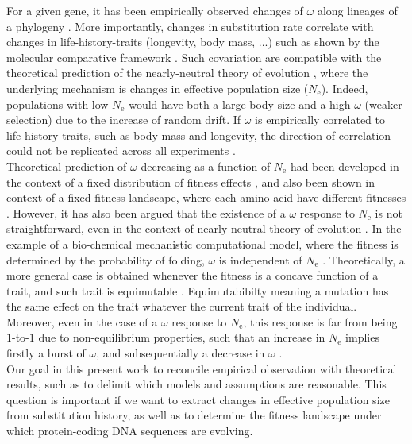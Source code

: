 \documentclass{article}
\newcommand{\Ne}{N_{\mathrm{e}}}
\newcommand{\dnds}{\omega}
\begin{document}
For a given gene, it has been empirically observed changes of $\dnds$ along lineages of a phylogeny \cite{Yang2001, Zhang2004}.
More importantly, changes in substitution rate correlate with changes in life-history-traits (longevity, body mass, ...) such as shown by the molecular comparative framework \cite{Lartillot2011,Weber2014}.
Such covariation are compatible with the theoretical prediction of the nearly-neutral theory of evolution \cite{Ohta1972, Ohta1992}, where the underlying mechanism is changes in effective population size ($\Ne$).
Indeed, populations with low $\Ne$ would have both a large body size and a high $\dnds$ (weaker selection) due to the increase of random drift.
If $\dnds$ is empirically correlated to life-history traits, such as body mass and longevity, the direction of correlation could not be replicated across all experiments \cite{Figuet2016}.\\

Theoretical prediction of $\dnds$ decreasing as a function of $\Ne$ had been developed in the context of a fixed distribution of fitness effects \cite{Ohta1972, Welch2008}, and also been shown in context of a fixed fitness landscape, where each amino-acid have different fitnesses \cite{Spielman2015a, DosReis2015}.
However, it has also been argued that the existence of a $\dnds$ response to $\Ne$ is not straightforward, even in the context of nearly-neutral theory of evolution \cite{Lanfear2014}.
In the example of a bio-chemical mechanistic computational model, where the fitness is determined by the probability of folding, $\dnds$ is independent of $\Ne$ \cite{Goldstein2013}.
Theoretically, a more general case is obtained whenever the fitness is a concave function of a trait, and such trait is equimutable \cite{Cherry1998}.
Equimutabibilty meaning a mutation has the same effect on the trait whatever the current trait of the individual.
Moreover, even in the case of a $\dnds$ response to $\Ne$, this response is far from being $1$-to-$1$ due to non-equilibrium properties, such that an increase in $\Ne$ implies firstly a burst of $\dnds$, and subsequentially a decrease in $\dnds$ \cite{Jones2016}.\\

Our goal in this present work to reconcile empirical observation with theoretical results, such as to delimit which models and assumptions are reasonable.
This question is important if we want to extract changes in effective population size from substitution history, as well as to determine the fitness landscape under which protein-coding DNA sequences are evolving.
\end{document}
